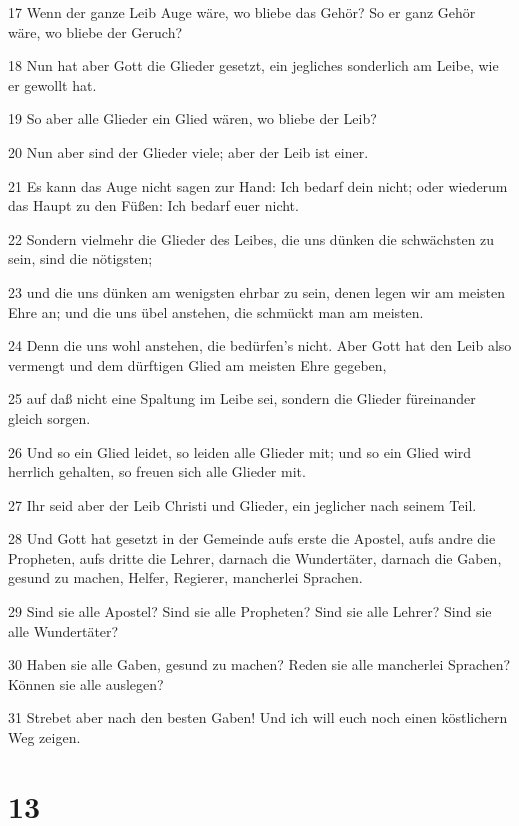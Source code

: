 \par 17 Wenn der ganze Leib Auge wäre, wo bliebe das Gehör? So er ganz Gehör wäre, wo bliebe der Geruch?
\par 18 Nun hat aber Gott die Glieder gesetzt, ein jegliches sonderlich am Leibe, wie er gewollt hat.
\par 19 So aber alle Glieder ein Glied wären, wo bliebe der Leib?
\par 20 Nun aber sind der Glieder viele; aber der Leib ist einer.
\par 21 Es kann das Auge nicht sagen zur Hand: Ich bedarf dein nicht; oder wiederum das Haupt zu den Füßen: Ich bedarf euer nicht.
\par 22 Sondern vielmehr die Glieder des Leibes, die uns dünken die schwächsten zu sein, sind die nötigsten;
\par 23 und die uns dünken am wenigsten ehrbar zu sein, denen legen wir am meisten Ehre an; und die uns übel anstehen, die schmückt man am meisten.
\par 24 Denn die uns wohl anstehen, die bedürfen's nicht. Aber Gott hat den Leib also vermengt und dem dürftigen Glied am meisten Ehre gegeben,
\par 25 auf daß nicht eine Spaltung im Leibe sei, sondern die Glieder füreinander gleich sorgen.
\par 26 Und so ein Glied leidet, so leiden alle Glieder mit; und so ein Glied wird herrlich gehalten, so freuen sich alle Glieder mit.
\par 27 Ihr seid aber der Leib Christi und Glieder, ein jeglicher nach seinem Teil.
\par 28 Und Gott hat gesetzt in der Gemeinde aufs erste die Apostel, aufs andre die Propheten, aufs dritte die Lehrer, darnach die Wundertäter, darnach die Gaben, gesund zu machen, Helfer, Regierer, mancherlei Sprachen.
\par 29 Sind sie alle Apostel? Sind sie alle Propheten? Sind sie alle Lehrer? Sind sie alle Wundertäter?
\par 30 Haben sie alle Gaben, gesund zu machen? Reden sie alle mancherlei Sprachen? Können sie alle auslegen?
\par 31 Strebet aber nach den besten Gaben! Und ich will euch noch einen köstlichern Weg zeigen.

\chapter{13}


